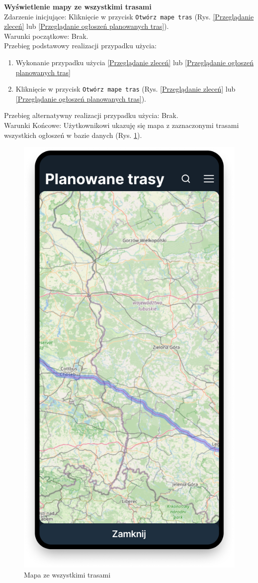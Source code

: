 \textbf{Wyświetlenie mapy ze wszystkimi trasami} \\
Zdarzenie inicjujące: Kliknięcie w przycisk \texttt{Otwórz mape tras} (Rys. \ref{Przeglądanie zleceń} lub \ref{Przeglądanie ogłoszeń planowanych tras}). \\
Warunki początkowe: Brak. \\
Przebieg podstawowy realizacji przypadku użycia:
\begin{enumerate}
    \item Wykonanie przypadku użycia \ref{Przeglądanie zleceń} lub \ref{Przeglądanie ogłoszeń planowanych tras}
    \item Kliknięcie w przycisk \texttt{Otwórz mape tras} (Rys. \ref{Przeglądanie zleceń} lub \ref{Przeglądanie ogłoszeń planowanych tras}).    
\end{enumerate}
Przebieg alternatywny realizacji przypadku użycia: Brak. \\
Warunki Końcowe: Użytkownikowi ukazuję się mapa z zaznaczonymi trasami wszystkich ogłoszeń w bazie danych (Rys. \ref{Rys. fig:Mapa ze wszystkimi trasami}).\\
\begin{figure}[H]
	\centering
		\includegraphics[width=0.3\linewidth]{rozdzial1/mapa.png}
	\caption{Mapa ze wszystkimi trasami}
	\label{Rys. fig:Mapa ze wszystkimi trasami}
\end{figure}